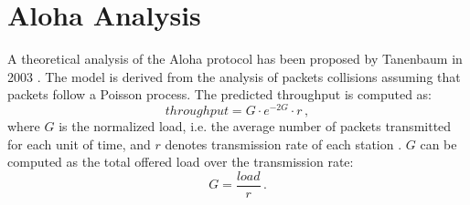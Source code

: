 \section{Aloha Analysis}
\label{sec:theoretical_aloha}

A theoretical analysis of the Aloha protocol has been proposed by Tanenbaum in 2003 \cite{tanenbaum2003computernetworks}.
The model is derived from the analysis of packets collisions assuming that packets follow a Poisson process.
The predicted throughput is computed as:
\begin{equation*}
    throughput = G \cdot e^{-2G} \cdot r\,,
\end{equation*}
where $G$ is the normalized load, i.e. the average number of packets transmitted for each unit of time, and $r$ denotes transmission rate of each station \cite{wiki:aloha}.
$G$ can be computed as the total offered load over the transmission rate:
\begin{equation*}
    G = \frac{load}{r}\,.
\end{equation*}
